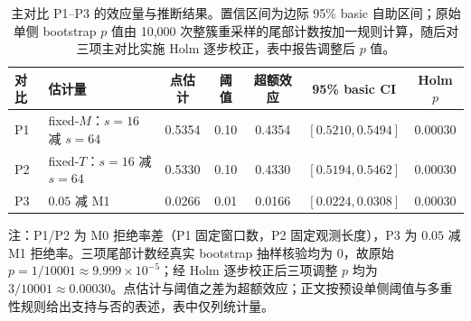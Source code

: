 \begin{table}[ht]
\centering
\footnotesize
\caption{主对比 P1--P3 的效应量与推断结果。置信区间为边际 95\% basic 自助区间；原始单侧 bootstrap $p$ 值由 10,000 次整簇重采样的尾部计数按加一规则计算，随后对三项主对比实施 Holm 逐步校正，表中报告调整后 $p$ 值。}\label{tab:primary}
\begin{tabular}{llccccc}
\toprule
对比 & 估计量 & 点估计 & 阈值 & 超额效应 & 95\% basic CI & Holm $p$\\
\midrule
P1 & fixed-$M$：$s{=}16$ 减 $s{=}64$ & 0.5354 & 0.10 & 0.4354 & $[0.5210,0.5494]$ & 0.00030\\
P2 & fixed-$T$：$s{=}16$ 减 $s{=}64$ & 0.5330 & 0.10 & 0.4330 & $[0.5194,0.5462]$ & 0.00030\\
P3 & $0.05$ 减 M1 & 0.0266 & 0.01 & 0.0166 & $[0.0224,0.0308]$ & 0.00030\\
\bottomrule
\end{tabular}

\begin{minipage}{0.94\textwidth}
\vspace{0.4em}
\footnotesize 注：P1/P2 为 M0 拒绝率差（P1 固定窗口数，P2 固定观测长度），P3 为 $0.05$ 减 M1 拒绝率。三项尾部计数经真实 bootstrap 抽样核验均为 0，故原始 $p=1/10001\approx9.999\times10^{-5}$；经 Holm 逐步校正后三项调整 $p$ 均为 $3/10001\approx0.00030$。点估计与阈值之差为超额效应；正文按预设单侧阈值与多重性规则给出支持与否的表述，表中仅列统计量。
\end{minipage}
\end{table}
